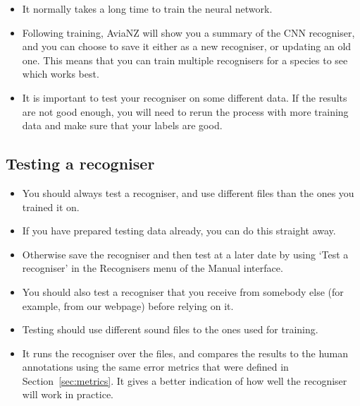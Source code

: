\documentclass{article}
\begin{document}
\begin{description}
\begin{itemize}
\item It normally takes a long time to train the neural network. 
\item Following training, AviaNZ will show you a summary of the CNN recogniser, and you can choose to save it either as a new recogniser, or updating an old one. This means that you can train multiple recognisers for a species to see which works best. 
\item It is important to test your recogniser on some different data. If the results are not good enough, you will need to rerun the process with more training data and make sure that your labels are good.
\end{itemize}
\end{description}

\subsection{Testing a recogniser}\label{sec:testfilter}

\begin{itemize}
\item You should always test a recogniser, and use different files than the ones you trained it on.
\item If you have prepared testing data already, you can do this straight away. 
\item Otherwise save the recogniser and then test at a later date by using `Test a recogniser' in the Recognisers menu of the Manual interface.
\item You should also test a recogniser that you receive from somebody else (for example, from our webpage) before relying on it.
\item Testing should use different sound files to the ones used for training. 
\item It runs the recogniser over the files, and compares the results to the human annotations using the same error metrics that were defined in Section~\ref{sec:metrics}. It gives a better indication of how well the recogniser will work in practice. %
\end{itemize}
\end{document}
